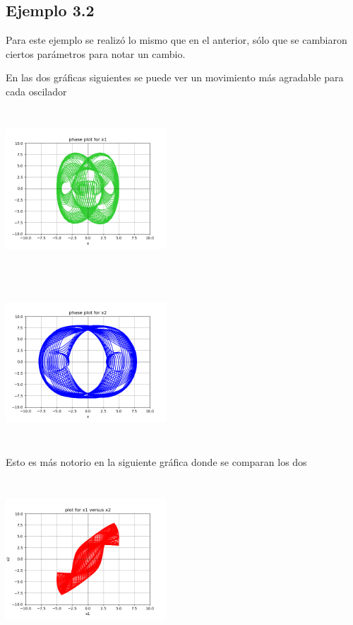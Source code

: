 \documentclass{article}
\begin{document}
\subsection{Ejemplo 3.2}

Para este ejemplo se realizó lo mismo que en el anterior, sólo que se cambiaron ciertos parámetros para notar un cambio.

En las dos gráficas siguientes se puede ver un movimiento más agradable para cada oscilador
\begin{center}
  \includegraphics[width=6cm, height=6cm]{ej3_21.png}
\end{center}

\begin{center}
  \includegraphics[width=6cm, height=6cm]{ej3_22.png}
\end{center}

Esto es más notorio en la siguiente gráfica donde se comparan los dos
\begin{center}
  \includegraphics[width=6cm, height=6cm]{ej3_23.png}
\end{center}
\end{document}
